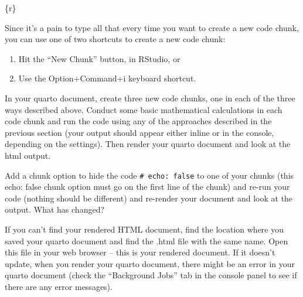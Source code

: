 \documentclass[
  letterpaper,
  DIV=11,
  numbers=noendperiod]{scrreprt}
\newenvironment{Shaded}{\begin{snugshade}}{\end{snugshade}}
\newcommand{\InformationTok}[1]{\textcolor[rgb]{0.37,0.37,0.37}{#1}}
\begin{document}
\begin{Shaded}
\begin{Highlighting}[]
\InformationTok{\textasciigrave{}\textasciigrave{}\textasciigrave{}\{r\}}


\InformationTok{\textasciigrave{}\textasciigrave{}\textasciigrave{}}
\end{Highlighting}
\end{Shaded}

Since it's a pain to type all that every time you want to create a new
code chunk, you can use one of two shortcuts to create a new code chunk:

\begin{enumerate}
\def\labelenumi{\arabic{enumi}.}
\item
  Hit the ``New Chunk'' button, in RStudio, or
\item
  Use the Option+Command+i keyboard shortcut.
\end{enumerate}

In your quarto document, create three new code chunks, one in each of
the three ways described above. Conduct some basic mathematical
calculations in each code chunk and run the code using any of the
approaches described in the previous section (your output should appear
either inline or in the console, depending on the settings). Then render
your quarto document and look at the html output.

Add a chunk option to hide the code \texttt{\#\textbar{}\ echo:\ false}
to one of your chunks (this echo: false chunk option must go on the
first line of the chunk) and re-run your code (nothing should be
different) and re-render your document and look at the output. What has
changed?

\begin{tcolorbox}[enhanced jigsaw, rightrule=.15mm, toptitle=1mm, title=\textcolor{quarto-callout-warning-color}{\faExclamationTriangle}\hspace{0.5em}{Common issue: I can't find my rendered document}, leftrule=.75mm, bottomtitle=1mm, colbacktitle=quarto-callout-warning-color!10!white, coltitle=black, titlerule=0mm, opacityback=0, colframe=quarto-callout-warning-color-frame, arc=.35mm, opacitybacktitle=0.6, bottomrule=.15mm, left=2mm, breakable, toprule=.15mm, colback=white]

If you can't find your rendered HTML document, find the location where
you saved your quarto document and find the .html file with the same
name. Open this file in your web browser -- this is your rendered
document. If it doesn't update, when you render your quarto document,
there might be an error in your quarto document (check the ``Background
Jobs'' tab in the console panel to see if there are any error messages).

\end{tcolorbox}
\end{document}
